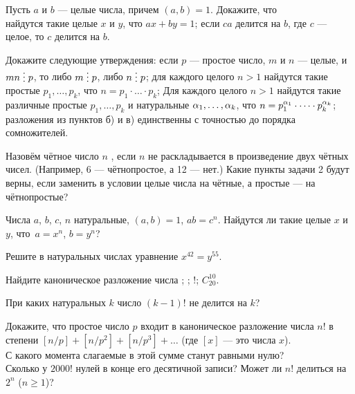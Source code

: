 \documentclass[a4paper,11pt]{article}
\newcommand{\del}{\mathrel{\raisebox{-.3 ex}{${\vdots}$}}}
\begin{document}
Пусть $a$ и $b$ --- целые числа, причем $(a,b)=1$. Докажите, что\\
 найдутся такие целые $x$ и $y$, что $ax+by=1$; 
 если $ca$ делится на $b$, где $c$ --- целое, то $c$ делится на $b$.


 Докажите следующие утверждения:
\vspace*{-3pt}
 если $p$ --- простое число, $m$ и $n$ --- целые, и $mn\del p$,
то либо $m\del p$, либо $n\del p$;
 для каждого целого $n>1$ найдутся такие простые
$p_1,\dots,p_k$, что $n=p_1\cdot \dots \cdot  p_k$; %
 Для каждого целого $n>1$ найдутся такие
различные простые $p_1,\dots,p_k$ и натуральные $\alpha_1,\dots,\alpha_k$, что
$n=p_1^{\alpha_1}\cdot \dots \cdot p_k^{\alpha_k}$; %
 разложения из пунктов б) и в) единственны с точностью до порядка
сомножителей.

Назов\"ем ч\"етное число $n$ , если $n$
не раскладывается
в произведение двух ч\"етных чисел. (Например, 6 --- ч\"етнопростое,
а 12 --- нет.)
Какие пункты задачи 2 будут верны, если
заменить в условии целые числа на ч\"етные, а
простые %
--- на ч\"етнопростые?

  Числа $a$, $b$, $c$, $n$ натуральные, $(a,b)=1$, $ab=c^n$.
Найдутся ли такие целые $x$ и $y$, что~$a=x^n$, $b=y^n$?

Решите в натуральных числах уравнение $x^{42}=y^{55}$.

Найдите каноническое разложение числа 
; ; !;  $C_{20}^{10}$.

 При каких натуральных $k$ число $(k-1)!$ не делится на $k$?

 Докажите, что простое число
$p$ входит в каноническое разложение числа $n!$
в степени $[n/p]+[n/p^2]+[n/{p^3}]+\dots$
(где $[x]$ --- это  числа $x$).\\
С какого момента слагаемые в этой сумме станут равными нулю?\\
 Сколько у $2000!$ нулей в конце его десятичной записи?
 Может ли $n!$ делиться на $2^n$ ($n\geq1$)?
\end{document}
